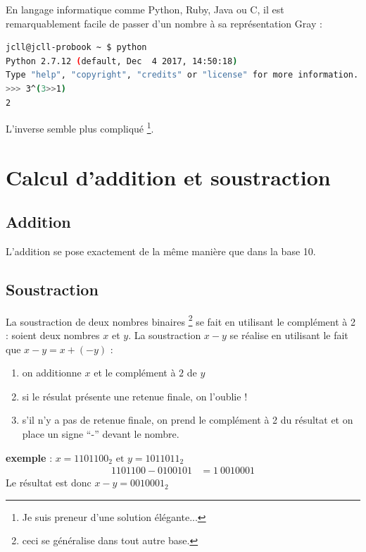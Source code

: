En langage informatique comme Python, Ruby, Java ou C, il est remarquablement facile de passer d'un nombre à sa représentation Gray :

\begin{lstlisting}[language=bash,frame=single]
jcll@jcll-probook ~ $ python
Python 2.7.12 (default, Dec  4 2017, 14:50:18)
Type "help", "copyright", "credits" or "license" for more information.
>>> 3^(3>>1)
2
\end{lstlisting}

L'inverse semble plus compliqué \footnote{Je suis preneur d'une solution élégante...}.

\section{Calcul d'addition et soustraction}
\subsection{Addition}
L'addition se pose exactement de la même manière que dans la base 10.

\subsection{Soustraction}
La soustraction de deux nombres binaires \footnote{ceci se généralise dans tout autre base.} se fait en utilisant le complément à 2 : soient deux nombres $x$ et $y$.
La soustraction $x-y$ se réalise en utilisant le fait que $x-y=x+(-y)$ :
\begin{enumerate}
\item on additionne $x$ et le complément à $2$ de $y$
\item si le résulat présente une retenue finale, on l'oublie !
\item s'il n'y a pas de retenue finale, on prend le complément à 2 du résultat et on place un signe ``-'' devant le nombre.
\end{enumerate}

{\bf exemple} : $x=1101100_2 \mbox{ et }y=1011011_2$ \\
\begin{align*}
1101100 - 0100101 &= 1\ 0010001
\end{align*}
Le résultat est donc $x-y=0010001_2$



